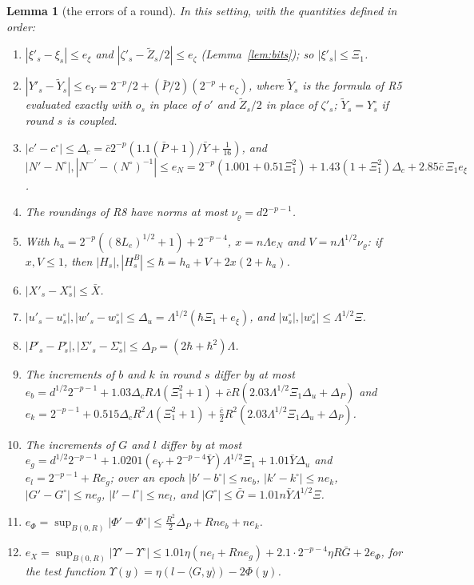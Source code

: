 \documentclass[11pt]{amsart}
\newtheorem{lemma}[theorem]{Lemma}
\theoremstyle{definition}
\numberwithin{equation}{section}
\newcommand{\ip}[1]{\langle #1\rangle}
\begin{document}
\begin{lemma}[the errors of a round]\label{lem:errors}
In this setting, with the quantities defined in order:
\begin{enumerate}[label=E\arabic*.,leftmargin=2.4em]
\item $|\xi'_s-\xi_s|\le e_\xi$ and $|\zeta'_s-\tilde Z_s/2|\le e_\zeta$ (Lemma~\ref{lem:bits}); so $|\xi'_s|\le\Xi_1$.
\item $|Y'_s-\tilde Y_s|\le e_Y=2^{-p}/2+(\bar P/2)(2^{-p}+e_\zeta)$, where $\tilde Y_s$ is the formula of R5 evaluated exactly with $o_s$ in place of $o'$ and $\tilde Z_s/2$ in place of $\zeta'_s$; $\tilde Y_s=Y^\circ_s$ if round $s$ is coupled.
\item $|c'-c^\circ|\le\Delta_c=\bar c2^{-p}(1.1(\bar P+1)/\bar Y+\frac1{16})$, and $|N'-N^\circ|,|N^{-\prime}-(N^\circ)^{-1}|\le e_N=2^{-p}(1.001+0.51\Xi_1^2)+1.43(1+\Xi_1^2)\Delta_c+2.85\bar c\,\Xi_1e_\xi$.
\item The roundings of R8 have norms at most $\nu_\varrho=d2^{-p-1}$.
\item With $h_a=2^{-p}((8L_e)^{1/2}+1)+2^{-p-4}$, $x=n\Lambda e_N$ and $V=n\Lambda^{1/2}\nu_\varrho$: if $x,V\le1$, then $|H_s|,|H^B_s|\le\hbar=h_a+V+2x(2+h_a)$.
\item $|X'_s-X^\circ_s|\le\bar X$.
\item $|u'_s-u^\circ_s|,|w'_s-w^\circ_s|\le\Delta_u=\Lambda^{1/2}(\hbar\Xi_1+e_\xi)$, and $|u^\circ_s|,|w^\circ_s|\le\Lambda^{1/2}\Xi$.
\item $|P'_s-P^\circ_s|,|\Sigma'_s-\Sigma^\circ_s|\le\Delta_P=(2\hbar+\hbar^2)\Lambda$.
\item The increments of $b$ and $k$ in round $s$ differ by at most $e_b=d^{1/2}2^{-p-1}+1.03\Delta_cR\Lambda(\Xi_1^2+1)+\bar cR(2.03\Lambda^{1/2}\Xi_1\Delta_u+\Delta_P)$ and $e_k=2^{-p-1}+0.515\Delta_cR^2\Lambda(\Xi_1^2+1)+\frac{\bar c}2R^2(2.03\Lambda^{1/2}\Xi_1\Delta_u+\Delta_P)$.
\item[E11.] The increments of $G$ and $l$ differ by at most $e_g=d^{1/2}2^{-p-1}+1.0201(e_Y+2^{-p-4}\bar Y)\Lambda^{1/2}\Xi_1+1.01\bar Y\Delta_u$ and $e_l=2^{-p-1}+Re_g$; over an epoch $|b'-b^\circ|\le ne_b$, $|k'-k^\circ|\le ne_k$, $|G'-G^\circ|\le ne_g$, $|l'-l^\circ|\le ne_l$, and $|G^\circ|\le\bar G=1.01n\bar Y\Lambda^{1/2}\Xi$.
\item[E12.] $e_\Phi=\sup_{B(0,R)}|\Phi'-\Phi^\circ|\le\frac{R^2}2\Delta_P+Rne_b+ne_k$.
\item[E13.] $e_X=\sup_{B(0,R)}|\Upsilon'-\Upsilon^\circ|\le1.01\eta(ne_l+Rne_g)+2.1\cdot2^{-p-4}\eta R\bar G+2e_\Phi$, for the test function $\Upsilon(y)=\eta(l-\ip{G,y})-2\Phi(y)$.

\end{enumerate}
\end{lemma}
\end{document}
